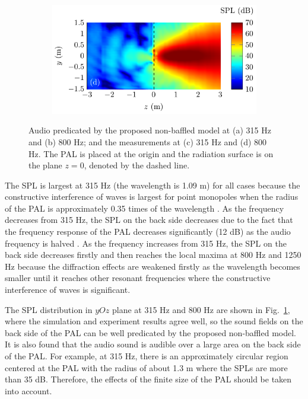 \begin{figure}[H]
\begin{subfigure}{0.49\textwidth}
    \end{subfigure}
    \begin{subfigure}{0.49\textwidth}
        \centering
        \includegraphics[width = \textwidth]{fig/ComparePalAudio2D_Experiment_800Hz.pdf}
    \end{subfigure}
    \caption{Audio  predicated by the proposed non-baffled model at (a) 315 Hz and (b) 800 Hz; and the measurements at (c) 315 Hz and (d) 800 Hz. The PAL is placed at the origin and the radiation surface is on the plane $z=0$, denoted by the dashed line.}
    \label{fig:disk_2d_results}
\end{figure}

The SPL is largest at 315 Hz (the wavelength is 1.09 m) for all cases because the constructive interference of waves is largest for point monopoles when the radius of the PAL is approximately 0.35 times of the wavelength \cite{Zhong2018EffectsFiniteSize}.
As the frequency decreases from 315 Hz, the SPL on the back side decreases due to the fact that the frequency response of the PAL decreases significantly (12 dB) as the audio frequency is halved \cite{Bennett1975ParametricArrayAir}. 
As the frequency increases from 315 Hz, the SPL on the back side decreases firstly and then reaches the local maxima at 800 Hz and 1250 Hz because the diffraction effects are weakened firstly as the wavelength becomes smaller until it reaches other resonant frequencies where the constructive interference of waves is significant. 

The SPL distribution in $yOz$ plane at 315 Hz and 800 Hz are shown in Fig.~\ref{fig:disk_2d_results}, where the simulation and experiment results agree well, so the sound fields on the back side of the PAL can be well predicated by the proposed non-baffled model. 
It is also found that the audio sound is audible over a large area on the back side of the PAL. 
For example, at 315 Hz, there is an approximately circular region centered at the PAL with the radius of about 1.3 m where the SPLs are more than 35 dB. 
Therefore, the effects of the finite size of the PAL should be taken into account.


